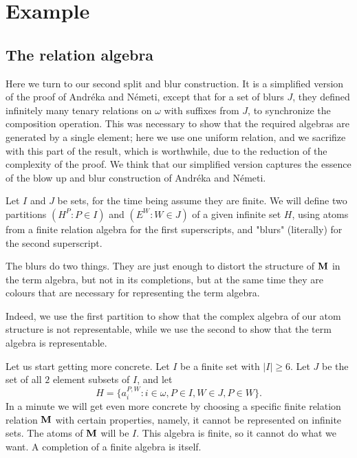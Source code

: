 \documentclass[12pt]{article}
\theoremstyle{definition}
\begin{document}
\section{Example}

\subsection{The relation algebra} 

Here we turn to our second split and blur construction.
It is a simplified version of the proof of Andr\'eka and N\'emeti, except that for a set of blurs $J$, 
they defined infinitely many tenary relations on $\omega$ with suffixes from $J$, to synchronize the composition operation. 
This was necessary to show
that the required algebras are generated by a single element; here we  use one uniform relation, 
and we sacrifize with this part of the result, which is worthwhile, due to
the reduction of the complexity of the proof. We think that
our simplified version captures the essence
of  the blow  up and blur construction of Andr\'eka and N\'emeti.

Let $I$ and $J$ be sets, for the time being assume they are finite.
We will define two partitions $(H^P: P\in I)$ and $(E^W: W\in J)$ of a given infinite set $H$,
using atoms from a finite relation algebra for the first superscripts, and "blurs" (literally) for the second superscript.

The blurs do two things. They are just enough to distort the structure of $\bold M$ in the term algebra, but not in its completions,
but at the same time they are colours that are necessary 
for representing the term algebra.

Indeed, we use the first partition to show that the complex algebra of our atom structure is not representable,
while we use the second to show that the term
algebra is representable.





Let us start getting more concrete. Let $I$ be a finite set with $|I|\geq 6$. Let $J$ be the set of all $2$ element
subsets of $I$, and let
$$H=\{a_i^{P,W}: i\in \omega, P\in I, W\in J, P\in W\}.$$
In a minute we will get even more concrete by choosing a specific finite relation relation $\bold M$ with certain properties, namely,
it cannot be represented on infinite sets. The atoms of $\bold M$ will be  $I$. This algebra is finite, so it cannot do what we want. 
A completion of a finite algebra is itself.
\end{document}

